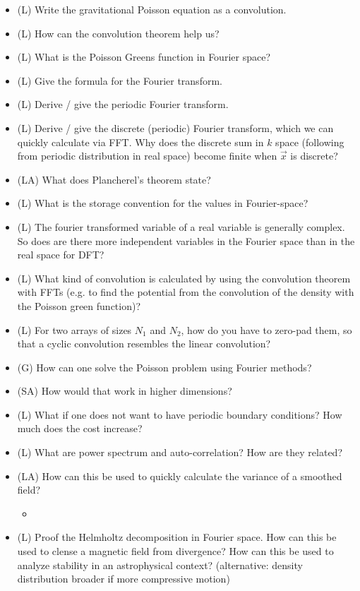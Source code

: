 \begin{itemize}
    \item (L) Write the gravitational Poisson equation as a convolution.
    \item (L) How can the convolution theorem help us?
    \item (L) What is the Poisson Greens function in Fourier space?
    \item (L) Give the formula for the Fourier transform. 
    \item (L) Derive / give the periodic Fourier transform.
    \item (L) Derive / give the discrete (periodic) Fourier transform, which we can quickly calculate via FFT.
    Why does the discrete sum in $k$ space (following from periodic distribution in real space) become finite when $\vec{x}$ is discrete?
    \item (LA) What does Plancherel's theorem state?
    \item (L) What is the storage convention for the values in Fourier-space?
    \item (L) The fourier transformed variable of a real variable is generally complex.
    So does are there more independent variables in the Fourier space than in the real space for DFT?
    \item (L) What kind of convolution is calculated by using the convolution theorem with FFTs
    (e.g. to find the potential from the convolution of the density with the Poisson green function)?
    \item (L) For two arrays of sizes $N_1$ and $N_2$, how do you have to zero-pad them, so that
    a cyclic convolution resembles the linear convolution?
    \item (G) How can one solve the Poisson problem using Fourier methods?
    \item (SA) How would that work in higher dimensions?
    \item (L) What if one does not want to have periodic boundary conditions? How much does the cost increase?
    \item (L) What are power spectrum and auto-correlation? How are they related?
    \item (LA) How can this be used to quickly calculate the variance of a smoothed field?
    \begin{itemize}
        \item {}
    \end{itemize}
    \item (L) Proof the Helmholtz decomposition in Fourier space. How can this be used to clense a
    magnetic field from divergence? How can this be used to analyze stability in an astrophysical context?
    (alternative: density distribution broader if more compressive motion)
\end{itemize}

